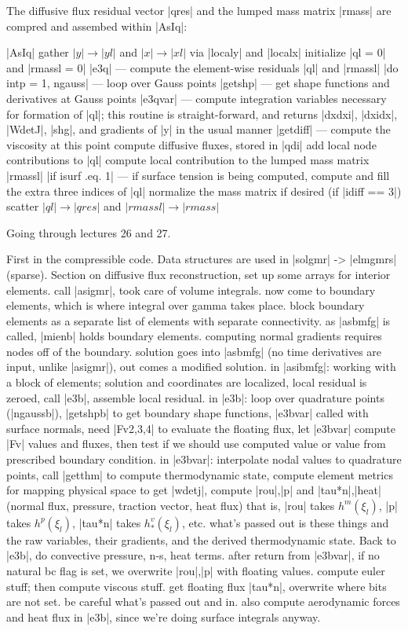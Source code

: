 \documentclass[11pt]{article}
\begin{document}
The diffusive flux residual vector |qres| and the lumped mass matrix |rmass| are compred and assembed within |AsIq|:
\begin{outline}[deep]
\1 |AsIq|
	\2 gather $|y| \rightarrow |yl|$ and $|x| \rightarrow |xl|$ via |localy| and |localx|
	\2 initialize |ql = 0| and |rmassl = 0|
	\2 |e3q| --- compute the element-wise residuals |ql| and |rmassl|
		\3 |do intp = 1, ngauss| --- loop over Gauss points
			\4 |getshp| --- get shape functions and derivatives at Gauss points
			\4 |e3qvar| --- compute integration variables necessary for formation of |ql|; this routine is straight-forward, and returns |dxdxi|, |dxidx|, |WdetJ|, |shg|, and gradients of |y| in the usual manner
			\4 |getdiff| --- compute the viscosity at this point
			\4 compute diffusive fluxes, stored in |qdi|
			\4 add local node contributions to |ql|
			\4 compute local contribution to the lumped mass matrix |rmassl|
			\4 |if isurf .eq. 1| --- if surface tension is being computed, compute and fill the extra three indices of |ql|
		\3 normalize the mass matrix if desired (if |idiff == 3|)
	\2 scatter $|ql| \rightarrow |qres|$ and $|rmassl| \rightarrow |rmass|$
\end{outline}

Going through lectures 26 and 27.

First in the compressible code.
Data structures are used in |solgmr| -> |elmgmrs| (sparse). Section on diffusive flux reconstruction, set up some arrays for interior elements. call |asigmr|, took care of volume integrals. now come to boundary elements, which is where integral over gamma takes place. block boundary elements as a separate list of elements with separate connectivity. as |asbmfg| is called, |mienb| holds boundary elements. computing normal gradients requires nodes off of the boundary. solution goes into |asbmfg| (no time derivatives are input, unlike |asigmr|), out comes a modified solution. in |asibmfg|: working with a block of elements; solution and coordinates are localized, local residual is zeroed, call |e3b|, assemble local residual. in |e3b|: loop over quadrature points (|ngaussb|), |getshpb| to get boundary shape functions, |e3bvar| called with surface normals, need |Fv{2,3,4}| to evaluate the floating flux, let |e3bvar| compute |Fv| values and fluxes, then test if we should use computed value or value from prescribed boundary condition. in |e3bvar|: interpolate nodal values to quadrature points, call |getthm| to compute thermodynamic state, compute element metrics for mapping physical space to get |wdetj|, compute |rou|,|p| and |tau*n|,|heat| (normal flux, pressure, traction vector, heat flux) that is, |rou| takes $h^m(\xi_l)$, |p| takes $h^p(\xi_l)$, |tau*n| takes $h^v_*(\xi_l)$, etc. what's passed out is these things and the raw variables, their gradients, and the derived thermodynamic state. Back to |e3b|, do convective pressure, n-s, heat terms. after return from |e3bvar|, if no natural bc flag is set, we overwrite |rou|,|p| with floating values. compute euler stuff; then compute viscous stuff. get floating flux |tau*n|, overwrite where bits are not set. be careful what's passed out and in. also compute aerodynamic forces and heat flux in |e3b|, since we're doing surface integrals anyway.
\end{document}

